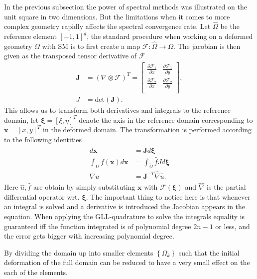 In the previous subsection the power of spectral methods was illustrated on the unit square in two dimensions.
But the limitations when it comes to more complex geometry rapidly affects the spectral convergence rate. 
Let $\hat{\Omega}$ be the reference element $[-1,1]^d$,
the standard procedure when working on a deformed geometry $\Omega$ with SM is to first create a map $\mathcal{F}:\hat{\Omega}\rightarrow\Omega$.
The jacobian is then given as the transposed tensor derivative of $\mathcal{F}$
\begin{align}
    \mathbf{J} &= (\nabla \otimes \mathcal{F})^T =
\begin{bmatrix}
    \frac{\partial \mathcal{F}_1}{\partial x} &  \frac{\partial \mathcal{F}_1}{\partial y}  \\ 	
	\frac{\partial \mathcal{F}_2}{\partial x} &  \frac{\partial \mathcal{F}_2}{\partial y} \\ 	
\end{bmatrix},\\
J &= \text{det}(\mathbf{J}).
    \label{eq:jaobian}
\end{align}
This allows us to transform both derivatives and integrals to the reference domain, let $\boldsymbol\xi = [\xi,\eta]^T$ denote the axis in the reference 
domain corresponding to $\mathbf{x} = [x,y]^T$ in the deformed domain. The transformation is performed according to the following identities
\begin{align}
    \begin{split}
        d\mathbf{x} &= \mathbf{J}d\boldsymbol\xi \\
        \int_{\Omega}f(\mathbf{x})d\mathbf{x} &= \int_{\hat\Omega}\hat f J d\boldsymbol\xi \\
        \nabla u &= \mathbf{J}^{-T}\hat\nabla \hat u.
    \end{split}
    \label{eq:transforms}
\end{align}
Here $\hat u,\hat f$ are obtain by simply substituting $\mathbf{x}$ with $\mathcal{F}(\boldsymbol{\xi})$ and $\hat \nabla $ is the partial 
differential operator wrt. $\boldsymbol\xi$. The important thing to notice here is that whenever an integral is solved and a derivative is 
introduced the Jacobian appears in the equation. When applying the GLL-quadrature to solve the integrals equality is guaranteed iff the 
function integrated is of polynomial degree $2n-1$ or less, and the error gets bigger with increasing polynomial degree.

By dividing the domain up into smaller elements $\left\{ \Omega_k \right\}$ such that 
 the initial deformation of the full domain 
can be reduced to have a very small effect on the each of the elements.

